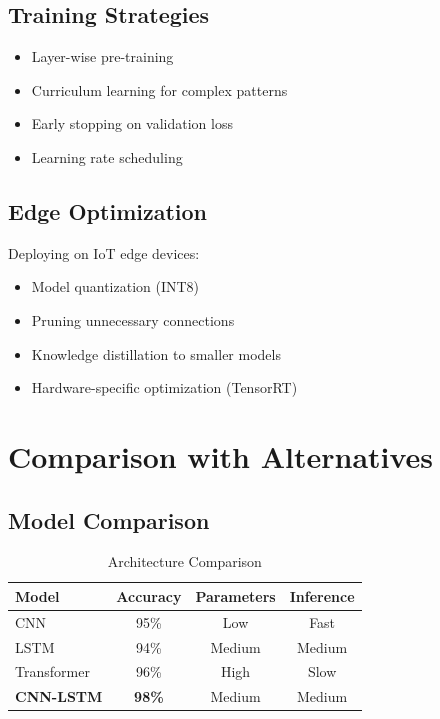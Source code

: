 \documentclass[12pt,a4paper]{article}
\begin{document}
\subsection{Training Strategies}

\begin{itemize}
    \item Layer-wise pre-training
    \item Curriculum learning for complex patterns
    \item Early stopping on validation loss
    \item Learning rate scheduling
\end{itemize}

\subsection{Edge Optimization}

Deploying on IoT edge devices:
\begin{itemize}
    \item Model quantization (INT8)
    \item Pruning unnecessary connections
    \item Knowledge distillation to smaller models
    \item Hardware-specific optimization (TensorRT)
\end{itemize}

\section{Comparison with Alternatives}

\subsection{Model Comparison}

\begin{table}[H]
\centering
\caption{Architecture Comparison}
\begin{tabular}{lccc}
\toprule
\textbf{Model} & \textbf{Accuracy} & \textbf{Parameters} & \textbf{Inference} \\
\midrule
CNN & 95\% & Low & Fast \\
LSTM & 94\% & Medium & Medium \\
Transformer & 96\% & High & Slow \\
\textbf{CNN-LSTM} & \textbf{98\%} & Medium & Medium \\
\bottomrule
\end{tabular}
\end{table}
\end{document}

